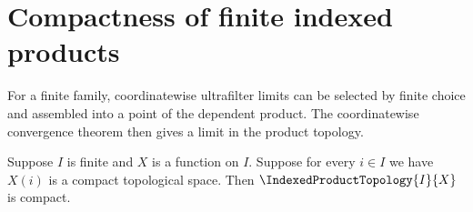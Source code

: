 \section{Compactness of finite indexed products}





For a finite family, coordinatewise ultrafilter limits can be selected by
finite choice and assembled into a point of the dependent product.  The
coordinatewise convergence theorem then gives a limit in the product
topology.

\begin{theorem}\label{finite_indexed_product_of_compact_spaces_is_compact}
    Suppose $I$ is finite and $X$ is a function on $I$.
    Suppose for every $i\in I$ we have
        $X(i)$ is a compact topological space.
    Then $\IndexedProductTopology{I}{X}$ is compact.
\end{theorem}
